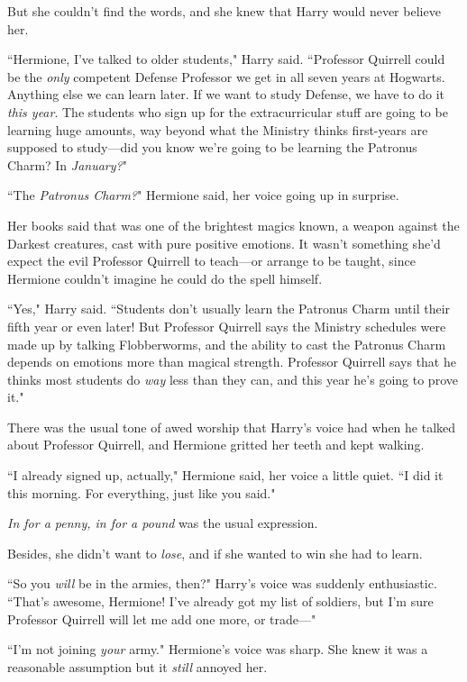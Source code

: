 But she couldn't find the words, and she knew that Harry would never believe her.

``Hermione, I've talked to older students," Harry said. ``Professor Quirrell could be the \emph{only} competent Defense Professor we get in all seven years at Hogwarts. Anything else we can learn later. If we want to study Defense, we have to do it \emph{this year}. The students who sign up for the extracurricular stuff are going to be learning huge amounts, way beyond what the Ministry thinks first-years are supposed to study—did you know we're going to be learning the Patronus Charm? In \emph{January?}"

``The \emph{Patronus Charm?}" Hermione said, her voice going up in surprise.

Her books said that was one of the brightest magics known, a weapon against the Darkest creatures, cast with pure positive emotions. It wasn't something she'd expect the evil Professor Quirrell to teach—or arrange to be taught, since Hermione couldn't imagine he could do the spell himself.

``Yes," Harry said. ``Students don't usually learn the Patronus Charm until their fifth year or even later! But Professor Quirrell says the Ministry schedules were made up by talking Flobberworms, and the ability to cast the Patronus Charm depends on emotions more than magical strength. Professor Quirrell says that he thinks most students do \emph{way} less than they can, and this year he's going to prove it."

There was the usual tone of awed worship that Harry's voice had when he talked about Professor Quirrell, and Hermione gritted her teeth and kept walking.

``I already signed up, actually," Hermione said, her voice a little quiet. ``I did it this morning. For everything, just like you said."

\emph{In for a penny, in for a pound} was the usual expression.

Besides, she didn't want to \emph{lose}, and if she wanted to win she had to learn.

``So you \emph{will} be in the armies, then?" Harry's voice was suddenly enthusiastic. ``That's awesome, Hermione! I've already got my list of soldiers, but I'm sure Professor Quirrell will let me add one more, or trade—"

``I'm not joining \emph{your} army." Hermione's voice was sharp. She knew it was a reasonable assumption but it \emph{still} annoyed her.

